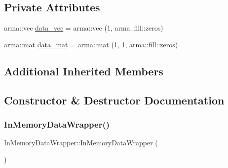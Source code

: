 \subsection*{Private Attributes}
\begin{DoxyCompactItemize}
\item 
arma\+::vec \mbox{\hyperlink{class_in_memory_data_wrapper_a7dc9516de29c977acf3a403d511a49ea}{data\+\_\+vec}} = arma\+::vec (1, arma\+::fill\+::zeros)
\item 
arma\+::mat \mbox{\hyperlink{class_in_memory_data_wrapper_af48ac59258e61cf5b970c089b19f4e12}{data\+\_\+mat}} = arma\+::mat (1, 1, arma\+::fill\+::zeros)
\end{DoxyCompactItemize}
\subsection*{Additional Inherited Members}


\subsection{Constructor \& Destructor Documentation}
\mbox{\label{class_in_memory_data_wrapper_a091dd35c773aed960bc9ea9e95f7ae5b}} 
\subsubsection{\texorpdfstring{In\+Memory\+Data\+Wrapper()}{InMemoryDataWrapper()}\hspace{0.1cm}{\footnotesize\ttfamily [1/2]}}
{\footnotesize\ttfamily In\+Memory\+Data\+Wrapper\+::\+In\+Memory\+Data\+Wrapper (\begin{DoxyParamCaption}{ }\end{DoxyParamCaption})\hspace{0.3cm}{\ttfamily [inline]}}

\mbox{\label{class_in_memory_data_wrapper_a0b3a3299fa46c88dc807e858c2f67a1f}} 
